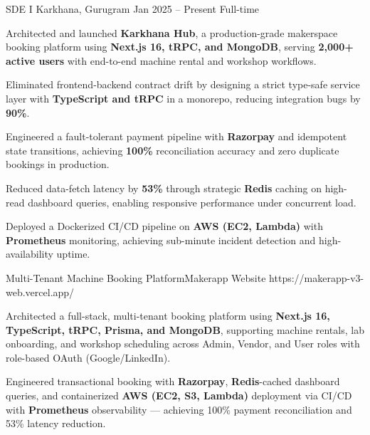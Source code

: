 \documentclass{bhaumic}
\begin{document}
\expentry
  {SDE I}
  {Karkhana, Gurugram}
  {Jan 2025 -- Present}
  {Full-time}
  {
    \begin{resbullets}
      \item Architected and launched \textbf{Karkhana Hub}, a production-grade makerspace booking platform using \textbf{Next.js 16, tRPC, and MongoDB}, serving \textbf{2,000+ active users} with end-to-end machine rental and workshop workflows.
      \item Eliminated frontend-backend contract drift by designing a strict type-safe service layer with \textbf{TypeScript and tRPC} in a monorepo, reducing integration bugs by \textbf{90\%}.
      \item Engineered a fault-tolerant payment pipeline with \textbf{Razorpay} and idempotent state transitions, achieving \textbf{100\%} reconciliation accuracy and zero duplicate bookings in production.
      \item Reduced data-fetch latency by \textbf{53\%} through strategic \textbf{Redis} caching on high-read dashboard queries, enabling responsive performance under concurrent load.
      \item Deployed a Dockerized CI/CD pipeline on \textbf{AWS (EC2, Lambda)} with \textbf{Prometheus} monitoring, achieving sub-minute incident detection and high-availability uptime.
    \end{resbullets}
  }



\begin{samepage}
\projentry
  {Multi-Tenant Machine Booking Platform}{Makerapp}
  {Website}
  {https://makerapp-v3-web.vercel.app/}
  {
    \begin{resbullets}
      \item Architected a full-stack, multi-tenant booking platform using \textbf{Next.js 16, TypeScript, tRPC, Prisma, and MongoDB}, supporting machine rentals, lab onboarding, and workshop scheduling across Admin, Vendor, and User roles with role-based OAuth (Google/LinkedIn).
      \item Engineered transactional booking with \textbf{Razorpay}, \textbf{Redis}-cached dashboard queries, and containerized \textbf{AWS (EC2, S3, Lambda)} deployment via CI/CD with \textbf{Prometheus} observability — achieving 100\% payment reconciliation and 53\% latency reduction.
    \end{resbullets}
  }
\end{samepage}
\end{document}
